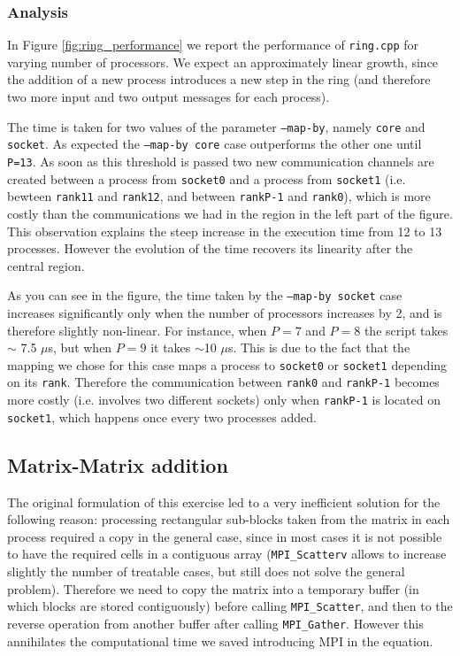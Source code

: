 \documentclass{article}
\begin{document}
\subsubsection{Analysis}
In Figure \ref{fig:ring_performance} we report the performance of \texttt{ring.cpp} for varying number of processors. We expect an approximately linear growth, since the addition of a new process introduces a new step in the ring (and therefore two more input and two output messages for each process).

The time is taken for two values of the parameter \texttt{--map-by}, namely \texttt{core} and \texttt{socket}. As expected the \texttt{--map-by core} case outperforms the other one until \texttt{P=13}. As soon as this threshold is passed two new communication channels are created between a process from \texttt{socket0} and a process from \texttt{socket1} (i.e. bewteen \texttt{rank11} and \texttt{rank12}, and between \texttt{rankP-1} and \texttt{rank0}), which is more costly than the communications we had in the region in the left part of the figure. This observation explains the steep increase in the execution time from 12 to 13 processes. However the evolution of the time recovers its linearity after the central region.

As you can see in the figure, the time taken by the \texttt{--map-by socket} case increases significantly only when the number of processors increases by 2, and is therefore slightly non-linear. For instance, when $P=7$ and $P=8$ the script takes $\sim$ 7.5 $\mu$s, but when $P=9$ it takes $\sim$10 $\mu$s. This is due to the fact that the mapping we chose for this case maps a process to \texttt{socket0} or \texttt{socket1} depending on its \texttt{rank}. Therefore the communication between \texttt{rank0} and \texttt{rankP-1} becomes more costly (i.e. involves two different sockets) only when \texttt{rankP-1} is located on \texttt{socket1}, which happens once every two processes added.

\subsection{Matrix-Matrix addition}
The original formulation of this exercise led to a very inefficient solution for the following reason: processing rectangular sub-blocks taken from the matrix in each process required a copy in the general case, since in most cases it is not possible to have the required cells in a contiguous array (\texttt{MPI\_Scatterv} allows to increase slightly the number of treatable cases, but still does not solve the general problem). Therefore we need to copy the matrix into a temporary buffer (in which blocks are stored contiguously) before calling \texttt{MPI\_Scatter}, and then to the reverse operation from another buffer after calling \texttt{MPI\_Gather}. However this annihilates the computational time we saved introducing MPI in the equation.
\end{document}

